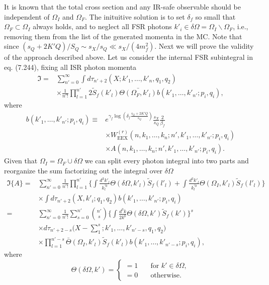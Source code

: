 It is known that the total cross section and any IR-safe observable should be independent of $\Omega_I$ and $\Omega_F$. The inituitive solution is to set $\delta_f$ so small that $\Omega_F\subset\Omega_I$ always holds, and to neglect all FSR photons $k'_i\in\delta\Omega=\Omega_I\backslash\Omega_F$, i.e., removing them from the list of the generated momenta in the MC. Note that since $(s_Q+2K'Q)/S_Q\sim s_X/s_Q\ll s_X/(4m^2_f)$. Next we will prove the validity of the approach described above. Let us consider the internal FSR subintegral in eq. (7.244), fixing all ISR photon momenta 
\begin{align}
\mathfrak{I}=&\sum_{n'=0}^{\infty}\int d\tau_{n'+2}(X;k'_1,\ldots,k'_n,q_1,q_2)\nonumber\\
&\times\frac{1}{n'!}\prod_{l=1}^{n'}2\widetilde{S}_f(k'_l)\bar{\Theta(\Omega_F,k'_l)}b(k'_1,\ldots,k'_{n'};p_i,q_i),
\end{align}
where
\begin{align*}
b(k'_1,\ldots,k'_{n'};p_i,q_i)\equiv& e^{\gamma_f\log\left(\delta_f\frac{s_Q+2K'Q}{s_Q}\right)}\frac{s_X}{s_Q}\frac{2}{\beta_f}\nonumber\\
&\times W^{(r)}_\text{EEX}(n,k_1,\ldots,k_n;n',k'_1,\ldots,k'_{n'};p_i,q_i)\nonumber\\
&\times A(n,k_1,\ldots,k_n;n',k'_1,\ldots,k'_{n'};p_i,q_i).
\end{align*}
Given that $\Omega_I=\Omega_F\cup\delta\Omega$ we can split every photon integral into two parts and reorganize the sum factorizing out the integral over $\delta\Omega$
\begin{align}
\mathfrak{I}\{A\}=&\sum_{n'=0}^{\infty}\frac{1}{n'!}\prod_{l=1}^{n'}\biggl\{ \int\frac{d^3k'_l}{k^{'0}_l}\Theta(\delta\Omega,k'_l)\widetilde{S}_f(l'_l)+\int\frac{d^3k'_l}{k^{'0}_l}\Theta(\Omega_I,k'_l)\widetilde{S}_f(l'_l) \biggr\}\nonumber\\
&\times \int d\tau_{n'+2}(X,k'_i;q_1,q_2)b(k'_1,\ldots,k'_{n'};p_i,q_i)\nonumber\\
=&\sum_{n'=0}^{\infty}\frac{1}{n'!}\sum_{s=0}^{n'}\binom{n'}{s}\biggl\{  \int\frac{d^3k}{2k^0}\Theta(\delta\Omega,k')\widetilde{S}_f(k') \biggr\}^s\nonumber\\
&\times d\tau_{n'+2-s}\biggl( X-\sum_{1}^{s};k'_1,\ldots,k'_{n'-s},q_1,q_2 \biggr)\nonumber\\
&\times\prod_{l=1}^{n'-s}\bar{\Theta}(\Omega_I,k'_l)\widetilde{S}_f(k'_l)b(k'_1,\ldots,k'_{n'-s};p_i,q_i),
\end{align}
where 
\begin{equation*}
\Theta(\delta\Omega,k')=\begin{cases}
=1\quad &\text{for }k'\in\delta\Omega,\\
=0\quad &\text{otherwise}.
\end{cases}
\end{equation*}

